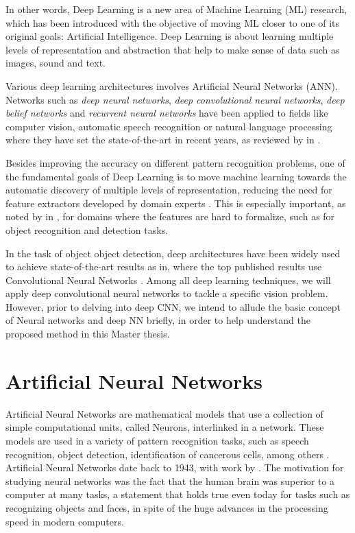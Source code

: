 In other words,  Deep Learning is a new area of Machine Learning (ML) research, which has been introduced with the objective of moving ML closer to one of its original goals: Artificial Intelligence. Deep Learning is about learning multiple levels of representation and abstraction that help to make sense of data such as images, sound and text\cite{tutorial2014lisa}.  

Various deep learning architectures involves Artificial Neural Networks (ANN). Networks such as \textit{deep neural networks}, \textit{deep convolutional neural networks},\textit{ deep belief networks} and \textit{recurrent neural networks} have been applied to fields like computer vision, automatic speech recognition or natural language processing where they have set the state-of-the-art in recent years, as reviewed by \citeauthor{bengio2009learning} in \cite{bengio2009learning, bengio2013deep}. 

Besides improving the accuracy on different pattern recognition problems, one of the fundamental goals of Deep Learning is to move machine learning towards the automatic discovery of multiple levels of representation, reducing the need for feature extractors developed by domain experts \cite{bengio2013deep}. This is especially important, as noted by \citeauthor{bengio2009learning} in \cite{bengio2009learning}, for domains where the features are hard to formalize, such as for object recognition and detection tasks.

In the task of object object detection, deep architectures have been widely used to achieve state-of-the-art results as in\cite{krizhevsky2009learning,krizhevsky2012imagenet}, where the top published results use Convolutional Neural Networks \cite{ciresan2012multi}. Among all deep learning techniques, we will apply deep convolutional neural networks to tackle a specific vision problem. However, prior to delving into deep CNN, we intend to allude the basic concept of Neural networks and deep NN briefly, in order to help understand the proposed method in this Master thesis.

\section{Artificial Neural Networks}

Artificial Neural Networks are mathematical models that use a collection of simple computational units, called Neurons, interlinked in a network. These models are used in a variety of pattern recognition tasks, such as speech recognition, object detection, identification of cancerous cells, among others \cite{hertz1991introduction}. Artificial Neural Networks date back to 1943, with work by \citeauthor{mcculloch1943logical} \cite{mcculloch1943logical}. The motivation for studying neural networks was the fact that the human brain was superior to a computer at many tasks, a statement that holds true even today for tasks such as recognizing objects and faces, in spite of the huge advances in the processing speed in modern computers.


